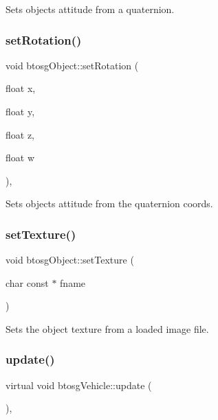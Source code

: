 Sets objects attitude from a quaternion. \mbox{\label{classbtosgObject_a4d21ca59b944fd26644db35d3e9ba67a}} 
\subsubsection{\texorpdfstring{set\+Rotation()}{setRotation()}\hspace{0.1cm}{\footnotesize\ttfamily [2/2]}}
{\footnotesize\ttfamily void btosg\+Object\+::set\+Rotation (\begin{DoxyParamCaption}\item[{float}]{x,  }\item[{float}]{y,  }\item[{float}]{z,  }\item[{float}]{w }\end{DoxyParamCaption})\hspace{0.3cm}{\ttfamily [inline]}, {\ttfamily [inherited]}}

Sets objects attitude from the quaternion coords. \mbox{\label{classbtosgObject_aff54acbc7c66811efb0cf2838107a241}} 
\subsubsection{\texorpdfstring{set\+Texture()}{setTexture()}}
{\footnotesize\ttfamily void btosg\+Object\+::set\+Texture (\begin{DoxyParamCaption}\item[{char const $\ast$}]{fname }\end{DoxyParamCaption})\hspace{0.3cm}{\ttfamily [inherited]}}

Sets the object texture from a loaded image file. \mbox{\label{classbtosgVehicle_a5fd0f471df492ac232c9b772a28bd2b9}} 
\subsubsection{\texorpdfstring{update()}{update()}}
{\footnotesize\ttfamily virtual void btosg\+Vehicle\+::update (\begin{DoxyParamCaption}{ }\end{DoxyParamCaption})\hspace{0.3cm}{\ttfamily [inline]}, {\ttfamily [virtual]}}

